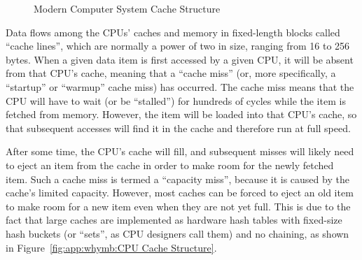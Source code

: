 \begin{figure}[htb]
\begin{center}
\end{center}
\caption{Modern Computer System Cache Structure}
\label{fig:app:whymb:Modern Computer System Cache Structure}
\end{figure}

Data flows among the CPUs' caches and memory in fixed-length blocks
called ``cache lines'', which are normally a power of two in size,
ranging from 16 to 256 bytes.
When a given data item is first accessed by a given CPU, it will
be absent from that CPU's cache, meaning that a ``cache miss''
(or, more specifically, a ``startup'' or ``warmup'' cache miss)
has occurred.
The cache miss means that the CPU will
have to wait (or be ``stalled'') for hundreds of cycles while the
item is fetched from memory.
However, the item will be loaded into that CPU's cache, so that
subsequent accesses will find it in the cache and therefore run
at full speed.

After some time, the CPU's cache will fill, and subsequent
misses will likely need to eject an item from the cache in order
to make room for the newly fetched item.
Such a cache miss is termed a ``capacity miss'', because it is caused
by the cache's limited capacity.
However, most caches can be forced to eject an old item to make room
for a new item even when they are not yet full.
This is due to the fact that large caches are implemented as hardware
hash tables with fixed-size hash buckets (or ``sets'', as CPU designers
call them) and no chaining, as shown in
Figure~\ref{fig:app:whymb:CPU Cache Structure}.

